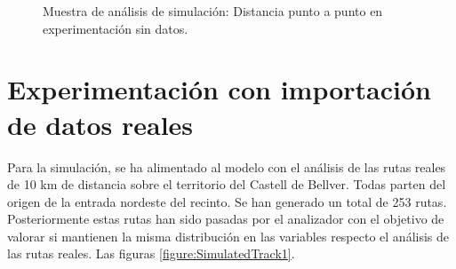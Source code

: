 \begin{figure}[!htb]
\begin{minipage}{0.48\textwidth}
\caption{Muestra de análisis de simulación: Distancia punto a punto en experimentación sin datos.}
\label{figure:SimulatedPointToPointEmpty}
\end{minipage}
\end{figure}


\section{Experimentación con importación de datos reales}
Para la simulación, se ha alimentado al modelo con el análisis de las rutas reales de 10 km de distancia sobre 
el territorio del Castell de Bellver. Todas parten del origen de la entrada nordeste del recinto. Se han generado un total de 253 rutas. Posteriormente estas rutas han sido pasadas por el analizador con el objetivo de valorar si mantienen la misma distribución en las variables respecto el análisis de las rutas reales. Las figuras \ref{figure:SimulatedTrack1}.
